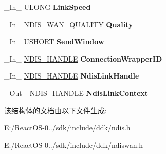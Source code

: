 \begin{DoxyCompactItemize}
\+\_\+\+In\+\_\+ U\+L\+O\+NG {\bfseries Link\+Speed}
\item 
\mbox{\label{struct___n_d_i_s___m_a_c___l_i_n_e___u_p_a45058c884345ae7fb2a4f9454c0f9341}} 
\+\_\+\+In\+\_\+ N\+D\+I\+S\+\_\+\+W\+A\+N\+\_\+\+Q\+U\+A\+L\+I\+TY {\bfseries Quality}
\item 
\mbox{\label{struct___n_d_i_s___m_a_c___l_i_n_e___u_p_a9f5274b8fc309c343a8854f9b2009465}} 
\+\_\+\+In\+\_\+ U\+S\+H\+O\+RT {\bfseries Send\+Window}
\item 
\mbox{\label{struct___n_d_i_s___m_a_c___l_i_n_e___u_p_ae1b9ad2dc6d99af91a0718022938d209}} 
\+\_\+\+In\+\_\+ \hyperlink{interfacevoid}{N\+D\+I\+S\+\_\+\+H\+A\+N\+D\+LE} {\bfseries Connection\+Wrapper\+ID}
\item 
\mbox{\label{struct___n_d_i_s___m_a_c___l_i_n_e___u_p_a47ac91b97419062c108b30539bd3792e}} 
\+\_\+\+In\+\_\+ \hyperlink{interfacevoid}{N\+D\+I\+S\+\_\+\+H\+A\+N\+D\+LE} {\bfseries Ndis\+Link\+Handle}
\item 
\mbox{\label{struct___n_d_i_s___m_a_c___l_i_n_e___u_p_a55666609a81f6e122c7a19f465b93b72}} 
\+\_\+\+Out\+\_\+ \hyperlink{interfacevoid}{N\+D\+I\+S\+\_\+\+H\+A\+N\+D\+LE} {\bfseries Ndis\+Link\+Context}
\end{DoxyCompactItemize}


该结构体的文档由以下文件生成\+:\begin{DoxyCompactItemize}
\item 
E\+:/\+React\+O\+S-\/0../sdk/include/ddk/ndis.\+h\item 
E\+:/\+React\+O\+S-\/0../sdk/include/ddk/ndiswan.\+h\end{DoxyCompactItemize}
